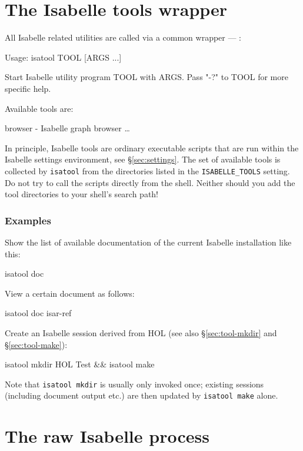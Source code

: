 \section{The Isabelle tools wrapper} \label{sec:isatool}

All Isabelle related utilities are called via a common wrapper ---
:
\begin{ttbox}
Usage: isatool TOOL [ARGS ...]

  Start Isabelle utility program TOOL with ARGS. Pass "-?" to TOOL
  for more specific help.

  Available tools are:

    browser - Isabelle graph browser
    \dots
\end{ttbox}
In principle, Isabelle tools are ordinary executable scripts that are run
within the Isabelle settings environment, see \S\ref{sec:settings}.  The set
of available tools is collected by \texttt{isatool} from the directories
listed in the \texttt{ISABELLE_TOOLS} setting.  Do not try to call the scripts
directly from the shell.  Neither should you add the tool directories to your
shell's search path!


\subsubsection*{Examples}

Show the list of available documentation of the current Isabelle installation
like this:
\begin{ttbox}
  isatool doc
\end{ttbox}

View a certain document as follows:
\begin{ttbox}
  isatool doc isar-ref
\end{ttbox}

Create an Isabelle session derived from HOL (see also \S\ref{sec:tool-mkdir}
and \S\ref{sec:tool-make}):
\begin{ttbox}
  isatool mkdir HOL Test && isatool make
\end{ttbox}
Note that \texttt{isatool mkdir} is usually only invoked once; existing
sessions (including document output etc.) are then updated by \texttt{isatool
  make} alone.


\section{The raw Isabelle process}

